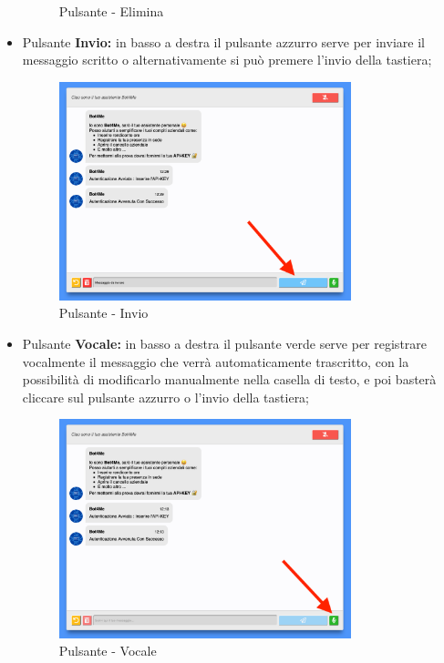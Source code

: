 \begin{itemize}
\begin{figure}[H]
            \caption{Pulsante - Elimina}
        \end{figure}
\newpage
    \item Pulsante \textbf{Invio:} in basso a destra il pulsante azzurro serve per inviare il messaggio scritto o alternativamente si può premere l'invio della tastiera;
        \begin{figure}[H]
            \centering\includegraphics[width=0.8\textwidth, height=0.7\textheight, keepaspectratio]{images/schermata_pulsante_invio.png}
            \caption{Pulsante - Invio}
        \end{figure}
\newpage
    \item Pulsante \textbf{Vocale:} in basso a destra il pulsante verde serve per registrare vocalmente il messaggio che verrà automaticamente trascritto, con la possibilità di modificarlo manualmente nella casella di testo, e poi basterà cliccare sul pulsante azzurro o l'invio della tastiera; 
        \begin{figure}[H]
            \centering\includegraphics[width=0.8\textwidth, height=0.7\textheight, keepaspectratio]{images/schermata_pulsante_vocale.png}
            \caption{Pulsante - Vocale}
        \end{figure}


\end{itemize}
